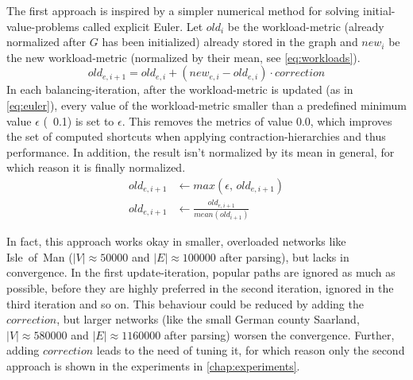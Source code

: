         The first approach is inspired by a simpler numerical method for solving initial-value-problems called explicit Euler.
        Let $\mathit{old}_i$ be the workload-metric (already normalized after $G$ has been initialized) already stored in the graph and $\mathit{new}_i$ be the new workload-metric (normalized by their mean, see \vref{eq:workloads}).
        \begin{equation}
        \label{eq:euler}
            \mathit{old}_{e,i+1} = \mathit{old}_{e,i} + (\mathit{new}_{e,i} - \mathit{old}_{e,i}) \cdot \mathit{correction}
        \end{equation}
        In each balancing-iteration, after the workload-metric is updated (as in \cref{eq:euler}), every value of the workload-metric smaller than a predefined minimum value $\epsilon$ (\eg\ \num{0.1}) is set to $\epsilon$.
        This removes the metrics of value \num{0.0}, which improves the set of computed shortcuts when applying contraction-hierarchies and thus performance.
        In addition, the result isn't normalized by its mean in general, for which reason it is finally normalized.
        \begin{equation}
        \label{eq:metric_cleanup}
        \begin{aligned}
            \mathit{old}_{e,i+1} &\leftarrow \mathit{max} \left( \epsilon \text{,\ } \mathit{old}_{e,i+1} \right)\\
            \mathit{old}_{e,i+1} &\leftarrow \frac{\mathit{old}_{e,i+1}}{\mathit{mean}(\mathit{old}_{i+1})}
        \end{aligned}
        \end{equation}

        In fact, this approach works okay in smaller, overloaded networks like Isle~of~Man ($|V| \approx \num{50000}$ and $|E| \approx \num{100000}$ after parsing), but lacks in convergence.
        In the first update-iteration, popular paths are ignored as much as possible, before they are highly preferred in the second iteration, ignored in the third iteration and so on.
        This behaviour could be reduced by adding the $\mathit{correction}$, but larger networks (like the small German county Saarland, $|V| \approx \num{580000}$ and $|E| \approx \num{1160000}$ after parsing) worsen the convergence.
        Further, adding $\mathit{correction}$ leads to the need of tuning it, for which reason only the second approach is shown in the experiments in \vref{chap:experiments}.

